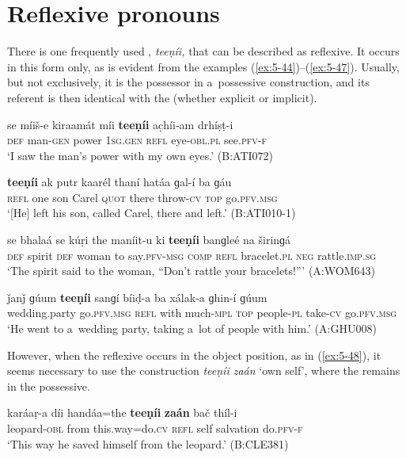 \section{Reflexive pronouns}
\label{sec:5-5}

There is one frequently used , \textit{teeṇíi,} that can be described as reflexive. It
occurs in this form only, as is evident from the examples (\ref{ex:5-44})--(\ref{ex:5-47}). Usually, but not
exclusively, it is the possessor in a~possessive construction, and its referent is then identical
with the   (whether explicit or implicit).

\begin{exe}
\ex
\label{ex:5-44}
\gll se míiš-e kiraamát míi \textbf{teeṇíi} ac̣híi-am drhíṣṭ-i\\
\textsc{def} man-\textsc{gen} power \textsc{1sg.gen} \textsc{refl} eye-\textsc{obl.pl} see.\textsc{pfv-f}\\
\glt `I saw the man's power with my own eyes.' (B:ATI072)

\ex
\label{ex:5-45}
\gll \textbf{teeṇíi} ak putr kaarél thaní hatáa ɡal-í ba ɡáu \\
\textsc{refl} one son Carel \textsc{quot} there throw-\textsc{cv} \textsc{top} go.\textsc{pfv.msg}\\
\glt `[He] left his son, called Carel, there and left.' (B:ATI010-1)

\ex
\label{ex:5-46}
\gll se bhalaá se kúṛi the maníit-u ki \textbf{teeṇíi} banɡleé na širinɡá\\
\textsc{def} spirit \textsc{def} woman to say.\textsc{pfv-msg} \textsc{comp} \textsc{refl} bracelet.\textsc{pl} \textsc{neg} rattle.\textsc{imp.sg}\\
\glt `The spirit said to the woman, ``Don't rattle your bracelets!''' (A:WOM643)

\ex
\label{ex:5-47}
\gll ǰanǰ ɡúum \textbf{teeṇíi} sanɡí bíiḍ-a ba xálak-a ɡhin-í ɡúum\\
wedding.party go.\textsc{pfv.msg } \textsc{refl} with much-\textsc{mpl} \textsc{top} people-\textsc{pl} take-\textsc{cv} go.\textsc{pfv.msg}\\
\glt `He went to a~wedding party, taking a~lot of people with him.' (A:GHU008)
\end{exe}
However, when the reflexive occurs in the object position, as in (\ref{ex:5-48}), it seems necessary to use the construction \textit{teeṇíi zaán} `own self', where the  remains in the possessive.
\begin{exe}
\ex
\label{ex:5-48}
\gll karáaṛ-a díi handáa=the \textbf{teeṇíi} \textbf{zaán} bač thíl-i\\
leopard-\textsc{obl} from this.way=do.\textsc{cv} \textsc{refl} self salvation do.\textsc{pfv-f}\\
\glt `This way he saved himself from the leopard.' (B:CLE381)
\end{exe}


